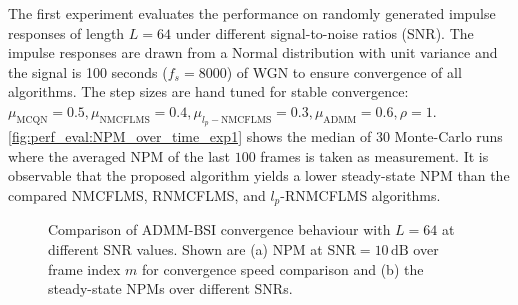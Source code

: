\documentclass{article}
\begin{document}
The first experiment evaluates the performance on randomly generated impulse responses of length \(L=64\) under different signal-to-noise ratios (SNR).
The impulse responses are drawn from a Normal distribution with unit variance and the signal is 100 seconds (\(f_s=8000\)) of WGN to ensure convergence of all algorithms.
The step sizes are hand tuned for stable convergence: \(\mu_{\text{MCQN}}=0.5, \mu_{\text{NMCFLMS}}=0.4, \mu_{l_p-\text{NMCFLMS}}=0.3, \mu_{\text{ADMM}}=0.6, \rho=1\).
\autoref{fig:perf_eval:NPM_over_time_exp1} shows the median of 30 Monte-Carlo runs where the averaged NPM of the last \(100\) frames is taken as measurement.
It is observable that the proposed algorithm yields a lower steady-state NPM than the compared NMCFLMS, RNMCFLMS, and \(l_p\)-RNMCFLMS algorithms.
\begin{figure}
    \centering
    \hspace*{-0.2cm}
    \hspace*{-0.0cm}
    \vspace*{-0.3cm}
    \caption{Comparison of ADMM-BSI convergence behaviour with \(L\!=\!64\) at different SNR values. Shown are (a) NPM at \(\text{SNR}=10\,\text{dB}\) over frame index \(m\) for convergence speed comparison and (b) the steady-state NPMs over different SNRs.}
    \label{fig:perf_eval:NPM_over_time_exp1}
\end{figure}
\end{document}
